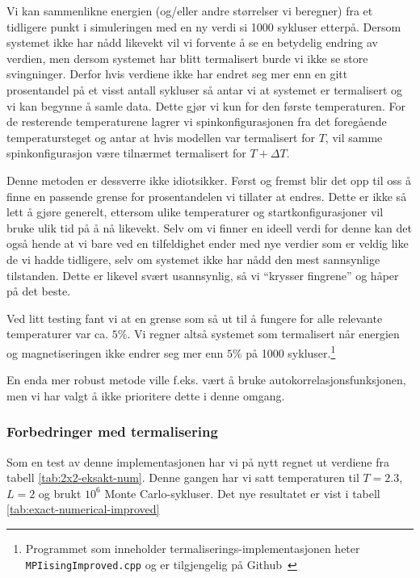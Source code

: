 \documentclass[11pt, twocolumn]{article}
\begin{document}
Vi kan sammenlikne energien (og/eller andre størrelser vi beregner)
fra et tidligere punkt i simuleringen med en ny verdi si 1000 sykluser
etterpå. Dersom systemet ikke har nådd likevekt vil vi forvente å se
en betydelig endring av verdien, men dersom systemet har blitt
termalisert burde vi ikke se store svingninger. Derfor hvis verdiene ikke har endret
seg mer enn en gitt prosentandel på et visst antall sykluser så antar vi at
systemet er termalisert og vi kan begynne å samle data. Dette gjør vi
kun for den første temperaturen. For de resterende temperaturene lagrer
vi spinkonfigurasjonen fra det foregående temperatursteget og antar at hvis
modellen var termalisert for $T$, vil samme spinkonfigurasjon være tilnærmet
termalisert for $T+ \Delta T$.

Denne metoden er dessverre ikke idiotsikker. Først og fremst blir
det opp til oss å finne en passende grense for prosentandelen vi
tillater at endres. Dette er ikke så lett å gjøre generelt, ettersom
ulike temperaturer og startkonfigurasjoner vil bruke ulik tid på å nå
likevekt. Selv om vi finner en ideell verdi for denne kan det også hende
at vi bare ved en tilfeldighet ender med nye verdier som er veldig
like de vi hadde tidligere, selv om systemet ikke har nådd den mest
sannsynlige tilstanden. Dette er likevel svært usannsynlig, så vi
``krysser fingrene'' og håper på det beste.

Ved litt testing fant vi at en grense som så ut til å fungere for alle relevante
temperaturer var ca. $5\%$. Vi regner altså systemet som termalisert når
energien og magnetiseringen ikke endrer seg mer enn $5 \%$ på 1000 sykluser.\footnote{Programmet som inneholder termaliserings-implementasjonen heter \texttt{MPIisingImproved.cpp} og er
tilgjengelig på Github~\cite{github-repo}}

En enda mer robust metode ville f.eks. vært å bruke autokorrelasjonsfunksjonen,
men vi har valgt å ikke prioritere dette i denne omgang.

\subsubsection{Forbedringer med termalisering}
Som en test av denne implementasjonen har vi på nytt regnet ut
verdiene fra tabell \ref{tab:2x2-eksakt-num}. Denne gangen har vi satt
temperaturen til $T=2.3$, $L=2$ og brukt $10^6$ Monte
Carlo-sykluser. Det nye resultatet er vist i tabell \ref{tab:exact-numerical-improved}
\end{document}
